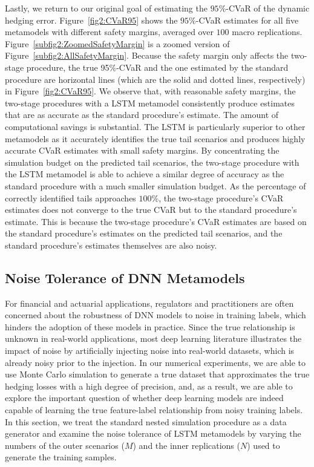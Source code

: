Lastly, we return to our original goal of estimating the $95\%$-CVaR of the dynamic hedging error.
Figure~\ref{fig2:CVaR95} shows the $95\%$-CVaR estimates for all five metamodels with different safety margins, averaged over $100$ macro replications.
Figure~\ref{subfig2:ZoomedSafetyMargin} is a zoomed version of Figure~\ref{subfig2:AllSafetyMargin}.
Because the safety margin only affects the two-stage procedure, the true 95\%-CVaR and the one estimated by the standard procedure are horizontal lines (which are the solid and dotted lines, respectively) in Figure~\ref{fig2:CVaR95}. 
We observe that, with reasonable safety margins, the two-stage procedures with a LSTM metamodel consistently produce estimates that are as accurate as the standard procedure's estimate.
The amount of computational savings is substantial.
The LSTM is particularly superior to other metamodels as it accurately identifies the true tail scenarios and produces highly accurate CVaR estimates with small safety margins.
By concentrating the simulation budget on the predicted tail scenarios, the two-stage procedure with the LSTM metamodel is able to achieve a similar degree of accuracy as the standard procedure with a much smaller simulation budget.
As the percentage of correctly identified tails approaches $100\%$, the two-stage procedure's CVaR estimates does not converge to the true CVaR but to the standard procedure's estimate.
This is because the two-stage procedure's CVaR estimates are based on the standard procedure's estimates on the predicted tail scenarios, and the standard procedure's estimates themselves are also noisy.

\subsection{Noise Tolerance of DNN Metamodels} \label{subsec2:noiseTolerance}

For financial and actuarial applications, regulators and practitioners are often concerned about the robustness of DNN models to noise in training labels, which hinders the adoption of these models in practice.
Since the true relationship is unknown in real-world applications, most deep learning literature illustrates the impact of noise by artificially injecting noise into real-world datasets, which is already noisy prior to the injection.
In our numerical experiments, we are able to use Monte Carlo simulation to generate a true dataset that approximates the true hedging losses with a high degree of precision, and, as a result, we are able to explore the important question of whether deep learning models are indeed capable of learning the true feature-label relationship from noisy training labels.
In this section, we treat the standard nested simulation procedure as a data generator and examine the noise tolerance of LSTM metamodels by varying the numbers of the outer scenarios ($M$) and the inner replications ($N$) used to generate the training samples.

